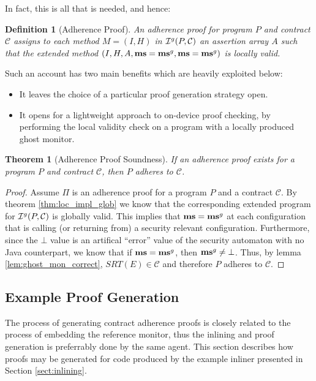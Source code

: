 \documentclass[10pt,twocolumn]{article}
\newtheorem{definition}{Definition}
\newtheorem{theorem}{Theorem}
\newcommand{\MS}{{\bf ms}}
\newcommand{\SRT}{\mathit{SRT}}
\newcommand{\Contract}{\mathcal{C}}
\begin{document}
In fact, this is all that is needed, and hence:
\begin{definition}[Adherence Proof]\label{def:proof_validity}
An adherence proof for program $P$ and contract $\Contract$
assigns to each method $M = (I,H)$ in ${\cal I}^g(P, \Contract)$ 
an assertion array $A$ such that the extended method
$(I,H,A,\MS = \MS^g,\MS = \MS^g)$ is locally valid.
\end{definition}
\noindent Such an account has two main benefits which are heavily exploited below:
\begin{itemize}
\item It leaves the choice of a particular proof generation 
strategy open.
\item It opens for a lightweight approach to on-device proof checking, by
performing the local validity check on a program with a locally produced
ghost monitor.
\end{itemize}
\begin{theorem}[Adherence Proof Soundness]\label{thm:proof_soundness}
If an adherence proof exists for a program $P$ and contract $\Contract$, 
then $P$ adheres to $\Contract$.
\end{theorem}
\begin{proof}
Assume $\Pi$ is an adherence proof for a program $P$ and a contract 
$\Contract$. By theorem \ref{thm:loc_impl_glob} we know that the
corresponding extended program for ${\cal I}^g(P, \Contract)$ is
globally valid.
This implies that $\MS = \MS^g$ at each configuration that is calling 
(or returning from) a security relevant configuration. Furthermore, since the 
$\bot$ value is an artifical ``error'' value of the security automaton with
no Java counterpart, we know that if $\MS = \MS^g$, then $\MS^g \neq \bot$. 
Thus, by lemma \ref{lem:ghost_mon_correct}, $\SRT(E) \in \Contract$ and 
therefore $P$ adheres to $\Contract$.
\end{proof}

\subsection{Example Proof Generation}
The process of generating contract adherence proofs is closely 
related to the process of embedding the reference monitor, thus the 
inlining and proof generation is preferrably done by the same agent. 
This section describes how proofs may be generated for code produced by 
the example inliner presented in Section \ref{sect:inlining}.
\end{document}
